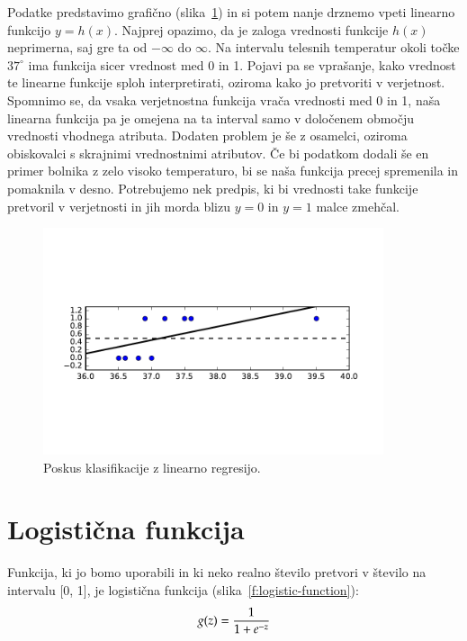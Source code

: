 Podatke predstavimo grafično (slika~\ref{f:class-linreg}) in si potem nanje drznemo vpeti linearno funkcijo $y=h(x)$. Najprej opazimo, da je zaloga vrednosti funkcije $h(x)$ neprimerna, saj gre ta od $-\infty$ do $\infty$. Na intervalu telesnih temperatur okoli točke $37^{\circ}$ ima funkcija sicer vrednost med 0 in 1. Pojavi pa se vprašanje, kako vrednost te linearne funkcije sploh interpretirati, oziroma kako jo pretvoriti v verjetnost. Spomnimo se, da vsaka verjetnostna funkcija vrača vrednosti med 0 in 1, naša linearna funkcija pa je omejena na ta interval samo v določenem območju vrednosti vhodnega atributa. Dodaten problem je še z osamelci, oziroma obiskovalci s skrajnimi vrednostnimi atributov. Če bi podatkom dodali še en primer bolnika z zelo visoko temperaturo, bi se naša funkcija precej spremenila in pomaknila v desno. Potrebujemo nek predpis, ki bi vrednosti take funkcije pretvoril v verjetnosti in jih morda blizu $y=0$ in $y=1$ malce zmehčal.

\begin{figure}[htbp]
\begin{center}
\includegraphics[width=10cm]{slike/class-linreg.pdf}
\caption{Poskus klasifikacije z linearno regresijo.}
\label{f:class-linreg}
\end{center}
\end{figure}

\section{Logistična funkcija}

Funkcija, ki jo bomo uporabili in ki neko realno število pretvori v število na intervalu [0, 1], je logistična funkcija (slika~\ref{f:logistic-function}):
\begin{equation}
  g(z) = {1\over 1+e^{-z}}
\end{equation}

